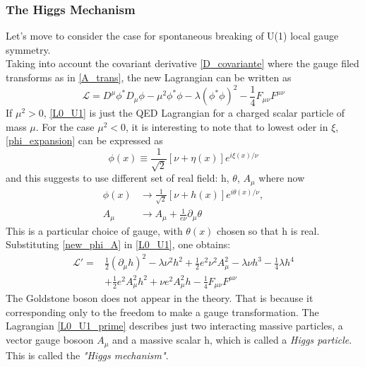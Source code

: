 \subsubsection{The Higgs Mechanism}%
Let's move to consider the case for spontaneous breaking of U(1) local gauge symmetry.\\
Taking into account the covariant derivative \ref{D_covariante} where the gauge filed transforms as in \ref{A_trans}, the new Lagrangian can be written as
\begin{equation}
\mathcal{L} = D^{\mu}\phi^{*}D_{\mu}\phi -\mu^{2}\phi^{*}\phi-\lambda(\phi^{*}\phi)^{2}-\frac{1}{4}F_{\mu\nu}F^{\mu\nu}
\label{L0_U1}
\end{equation}
If $\mu^{2} > 0$, \ref{L0_U1} is just the QED Lagrangian for a charged scalar particle of mass $\mu$.
For the case $\mu^{2} < 0$, it is interesting to note that to lowest oder in $\xi$, \ref{phi_expansion} can be expressed as
\begin{equation}
\phi(x) \equiv \frac{1}{\sqrt{2}}[\nu+\eta(x)]e^{i\xi(x)/\nu}
\label{phi_expansion_2}
\end{equation}
and this suggests to use different set of real field: h, $\theta$, $A_{\mu}$ where now
\begin{equation}
\begin{split}
\phi(x) &\to \frac{1}{\sqrt{2}}[\nu+h(x)]e^{i\theta(x)/\nu}, \\
A_{\mu} &\to A_{\mu}+ \frac{1}{e\nu}\partial_{\mu}\theta
\end{split}
\label{new_phi_A}
\end{equation}
This is a particular choice of gauge, with $\theta(x)$ chosen so that h is real. Substituting \ref{new_phi_A} in \ref{L0_U1}, one obtains:
\begin{equation}
\begin{split}
\mathcal{L}' = &\frac{1}{2}(\partial_{\mu}h)^{2}-\lambda\nu^{2}h^{2}+\frac{1}{2}e^{2}\nu^{2}A_{\mu}^{2}-\lambda\nu h^{3}-\frac{1}{4}\lambda h^{4}\\
&+\frac{1}{2}e^{2}A_{\mu}^{2}h^{2}+\nu e^{2}A_{\mu}^{2}h-\frac{1}{4}F_{\mu\nu}F^{\mu\nu}
\end{split}
\label{L0_U1_prime}
\end{equation}
The Goldstone boson does not appear in the theory. That is because it corresponding only to the freedom to make a gauge transformation. The Lagrangian \ref{L0_U1_prime} describes just two interacting massive particles, a vector gauge bosoon $A_{\mu}$ and a massive scalar h, which is called a \textit{Higgs particle}. This is called the \textit{"Higgs mechanism"}.\\
